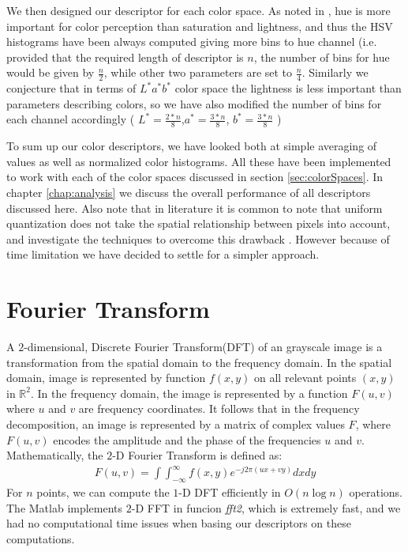 \documentclass{report}
\begin{document}
We then designed our descriptor for each color space. As noted in \cite{HSV_non_uniform}, hue is more important for color perception than saturation and lightness, and thus the HSV histograms have been always computed giving more bins to hue channel (i.e. provided that the required length of descriptor is $n$, the number of bins for hue would be given by $\frac{n}{2}$, while other two parameters are set to $\frac{n}{4}$. Similarly we conjecture that in terms of $L^*a^*b^*$ color space the lightness is less important than parameters describing colors, so we have also modified the number of bins for each channel accordingly ( $L^* = \frac{2*n}{8}$,$ a^* = \frac{3*n}{8}$, $b^* = \frac{3*n}{8}$ )

To sum up our color descriptors, we have looked both at simple averaging of values as well as normalized color histograms. All these have been implemented to work with each of the color spaces discussed in section \ref{sec:colorSpaces}. In chapter \ref{chap:analysis} we discuss the overall performance of all descriptors discussed here. Also note that in literature it is common to note that uniform quantization does not take the spatial relationship between pixels into account, and investigate the techniques to overcome this drawback \cite{GaussQunatization}. However because of time limitation we have decided to settle for a simpler approach.

\section{Fourier Transform} 
\label{sec:FFT} 
A $2$-dimensional, Discrete Fourier Transform(DFT) of an grayscale image is a transformation from the spatial domain to the frequency domain. In the spatial domain, image is represented by function $f(x,y)$ on all relevant points $(x,y)$ in  $\mathbb{R}^2$. In the frequency domain, the image is represented by a function $F(u,v)$ where $u$ and $v$ are frequency coordinates. It follows that in the frequency decomposition, an image is represented by a matrix of complex values $F$, where $F(u,v)$ encodes the amplitude and the phase of the frequencies $u$ and $v$. Mathematically, the $2$-D Fourier Transform is defined as:
\begin{eqnarray}
F(u,v) = \int \int ^{\infty}_{-\infty} f(x,y)e^{-j2\pi (ux+vy)}dx dy
\end{eqnarray}
For $n$ points, we can compute the $1$-D DFT efficiently in $O(n\log{n})$ operations. The Matlab implements $2$-D FFT  in funcion \textit{fft2}, which is extremely  fast, and we had no computational time issues when basing our descriptors on these computations.
\end{document}
